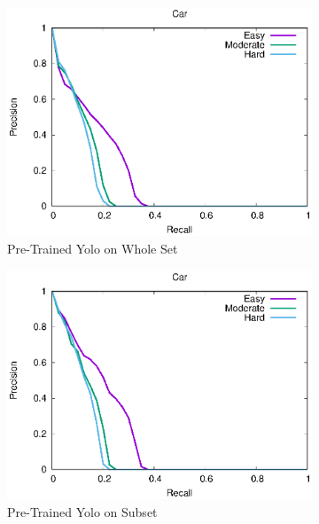 \begin{figure}[h!]
\centering
\begin{subfigure}[t]{.24\textwidth}
    \centering
    \includegraphics[width=1.0\linewidth]{img/yolo_Nov_4/plot_valid/car_detection.eps}
    \caption{Pre-Trained Yolo on Whole Set}
\end{subfigure}
\begin{subfigure}[t]{.24\textwidth}
    \centering
    \includegraphics[width=1.0\linewidth]{img/yolo_Nov_4/plot_valid_30/car_detection.eps}
    \caption{Pre-Trained Yolo on Subset}
\end{subfigure}
\begin{subfigure}[t]{.24\textwidth}
    \centering

\end{subfigure}
\end{figure}
